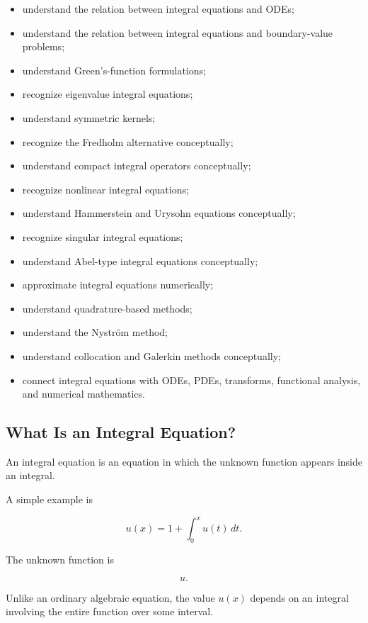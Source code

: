 {\begin{itemize}
    \item understand the relation between integral equations and ODEs;
    \item understand the relation between integral equations and
          boundary-value problems;
    \item understand Green's-function formulations;
    \item recognize eigenvalue integral equations;
    \item understand symmetric kernels;
    \item recognize the Fredholm alternative conceptually;
    \item understand compact integral operators conceptually;
    \item recognize nonlinear integral equations;
    \item understand Hammerstein and Urysohn equations conceptually;
    \item recognize singular integral equations;
    \item understand Abel-type integral equations conceptually;
    \item approximate integral equations numerically;
    \item understand quadrature-based methods;
    \item understand the Nystr\"om method;
    \item understand collocation and Galerkin methods conceptually;
    \item connect integral equations with ODEs, PDEs, transforms,
          functional analysis, and numerical mathematics.
\end{itemize}
}

\subsection{What Is an Integral Equation?}
\label{subsec:what-is-integral-equation}

An integral equation is an equation in which the unknown function appears
inside an integral.

A simple example is

\[
\boxed{
u(x)
=
1
+
\int_0^x
u(t)\,dt.
}
\]

The unknown function is

\[
u.
\]

Unlike an ordinary algebraic equation, the value \(u(x)\) depends on an
integral involving the entire function over some interval.

